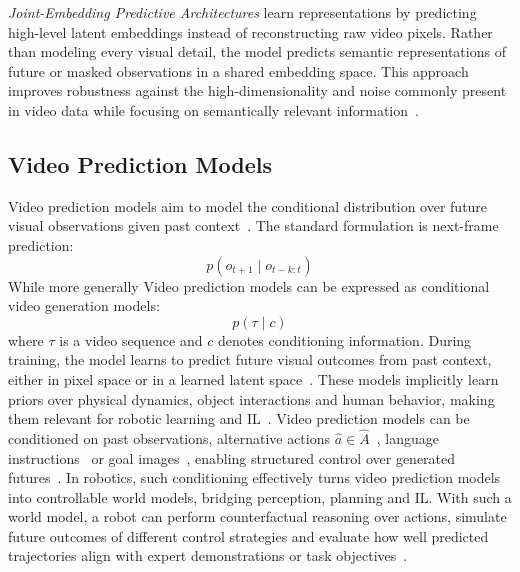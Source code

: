 
\textit{Joint-Embedding Predictive Architectures} learn representations by predicting high-level latent embeddings instead of reconstructing raw video pixels. Rather than modeling every visual detail, the model predicts semantic representations of future or masked observations in a shared embedding space. This approach improves robustness against the high-dimensionality and noise commonly present in video data while focusing on semantically relevant information~\cite{bardes2023v}.






\subsection{Video Prediction Models}
\label{sec:VideoPredictionModels}
Video prediction models aim to model the conditional distribution over future visual observations given past context~\cite{McCarthy_2025}. The standard formulation is next-frame prediction:
\begin{equation}
p(o_{t+1} \mid o_{t-k:t})
\end{equation}
While more generally Video prediction models can be expressed as conditional video generation models:
\begin{equation}
    p(\tau \mid c)
\end{equation}
where $\tau$ is a video sequence and $c$ denotes conditioning information.
During training, the model learns to predict future visual outcomes from past context, either in pixel space or in a learned latent space~\cite{McCarthy_2025}. These models implicitly learn priors over physical dynamics, object interactions and human behavior, making them relevant for robotic learning and \ac{IL}~\cite{McCarthy_2025}.
Video prediction models can be conditioned on past observations, alternative actions $\hat{a} \in \hat{A}$~\cite{Bruce2024GenieGI}, language instructions~\cite{Yang2024VideoAT, BarTal2024LumiereAS, Kondratyuk2023VideoPoetAL} or goal images~\cite{Hoppe2022DiffusionMF}, enabling structured control over generated futures~\cite{McCarthy_2025, Yang2024VideoAT}.
In robotics, such conditioning effectively turns video prediction models into controllable world models, bridging perception, planning and \ac{IL}. With such a world model, a robot can perform counterfactual reasoning over actions, simulate future outcomes of different control strategies and evaluate how well predicted trajectories align with expert demonstrations or task objectives~\cite{Wang2026WorldMF}.



